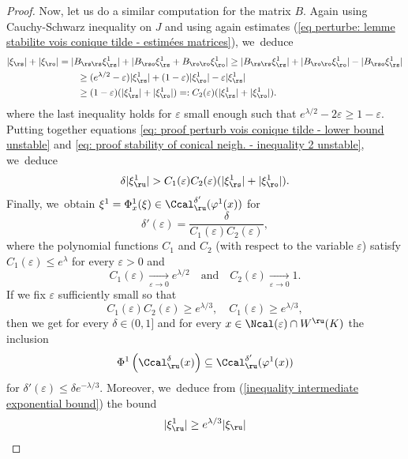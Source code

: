 \begin{proof}
Now, let us do a similar computation for the matrix $B$.
Again using Cauchy-Schwarz inequality on $J$ and using again estimates (\ref{eq perturbe: lemme stabilite vois conique tilde - estimées matrices}), we~deduce
\begin{equation}\label{eq: proof stability of conical neigh. - inequality 2 unstable}
\begin{split}
|\xi_\rs| + |\xi_\ro| &= | B_{\rs\rs} \xi_\rs^1 | + |B_{\rso} \xi_\rs^1 + B_{\ro\ro} \xi_\ro^1 | \geq |B_{\rs\rs} \xi_\rs^1| + |B_{\ro\ro} \xi_\ro^1| - |B_{\rso} \xi_\rs^1| \\
&\qquad \geq (e^{\lambda/2} -\varepsilon) |\xi_\rs^1| + (1 - \varepsilon)|\xi_\ro^1| - \varepsilon |\xi_\rs^1| \\
&\qquad \geq (1 - \varepsilon)(|\xi_\rs^1| + |\xi_\ro^1|) =: C_2 (\varepsilon) (|\xi_\rs^1| + |\xi_\ro^1|).
\end{split}
\end{equation}
where the last inequality holds for $\varepsilon$ small enough such that $e^{\lambda/2} - 2 \varepsilon \geq 1 - \varepsilon$.
Putting together equations \eqref{eq: proof perturb vois conique tilde - lower bound unstable} and \eqref{eq: proof stability of conical neigh. - inequality 2 unstable}, we~deduce
\begin{align*}
\delta|\xi_\ru^1| > C_1 (\varepsilon) C_2 (\varepsilon) (|\xi_\rs^1| + |\xi_\ro^1|).
\end{align*}
Finally, we~obtain $\xi^1 = \Phi_x^1 (\xi) \in \Ccal_\ru^{\delta'}(\varphi^1 (x))$ for
\[
\delta'(\varepsilon) = \frac{\delta }{C_1 (\varepsilon) C_2 (\varepsilon)},
\]
where the polynomial functions $C_1$ and $C_2$ (with respect to the variable $\varepsilon$) satisfy $C_1 (\varepsilon) \leq e^{\lambda}$ for every $\varepsilon >0$ and
\[
C_1 (\varepsilon) \underset{\varepsilon \to 0}{\to} e^{\lambda/2} \quad\text{and}\quad C_2 (\varepsilon) \underset{\varepsilon\to 0}{\to} 1.
\]
If we fix $\varepsilon$ sufficiently small so that
\begin{equation}\label{eq: proof big lemma - estimates C1 C2}
C_1 (\varepsilon) C_2 (\varepsilon) \geq e^{\lambda/3}, \quad C_1 (\varepsilon) \geq e^{\lambda/3},
\end{equation}
then we get for every $\delta\in(0,1]$ and for every $x \in \Ncal (\varepsilon)\cap W^\ru(K)$ the inclusion
\[
\Phi^{1}\left(\Ccal_{\ru}^{\delta}(x)\right) \subseteq \Ccal_{\ru}^{\delta'}(\varphi^{1}(x))
\]
for $\delta'(\varepsilon) \leq \delta e^{-\lambda/3}$. Moreover, we~deduce from (\ref{inequality intermediate exponential bound}) the bound
\begin{equation}\label{inequality intermediate exponential bound 2}
|\xi_\ru^{1}| \geq e^{\lambda/3} |\xi_\ru|
\end{equation}


\end{proof}
